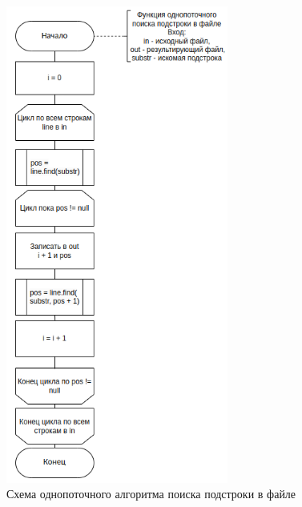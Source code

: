\begin{figure}[h]
	\centering
	\includegraphics[width=0.65\textwidth]{img/single.png}
	\caption{Схема однопоточного алгоритма поиска подстроки в файле}
	\label{fig:single}
\end{figure}

\clearpage

